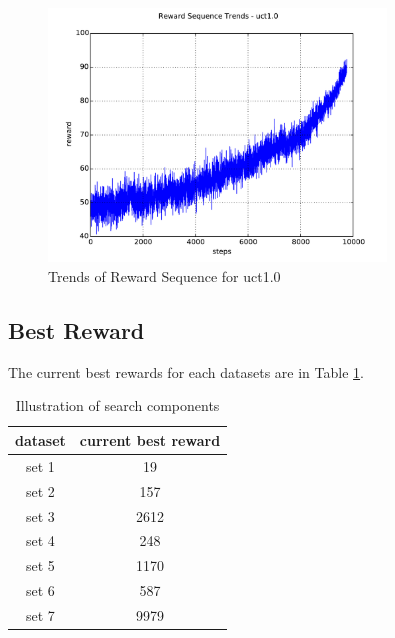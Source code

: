 \documentclass{article}
\begin{document}
\begin{figure}[htb!]
\centering
\includegraphics[width=0.8\textwidth]{trends_uct1_0.pdf}
\caption{\label{fig:trends_uct1.0}Trends of Reward Sequence for uct1.0}
\end{figure}



\subsection{Best Reward}
The current best rewards for each datasets are in Table \ref{tab:best_rewards}.

\begin{table}[htbp]
  \centering
  \caption{Illustration of search components}
    \begin{tabular}{cc}
    \toprule
    dataset & current best reward \\
    \midrule
    set 1 & 19 \\
    set 2 & 157 \\
    set 3 & 2612 \\
    set 4 & 248 \\
    set 5 & 1170 \\
    set 6 & 587 \\
    set 7 & 9979 \\
    \bottomrule
    \end{tabular}%
  \label{tab:best_rewards}%
\end{table}%
\end{document}
